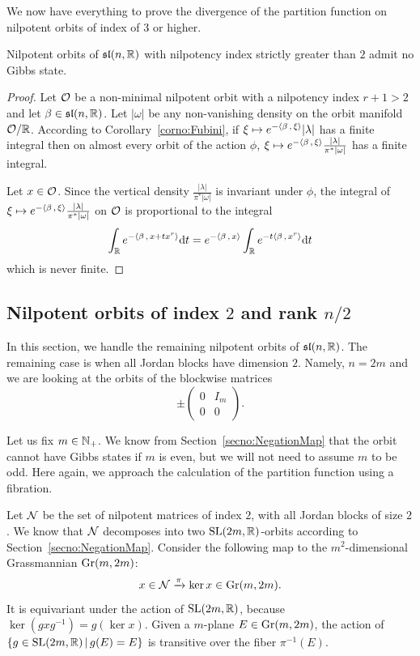 \documentclass[english]{article}
\begin{document}
We now have everything to prove the divergence of the partition function on nilpotent orbits of index of $3$ or higher.
\begin{theorem}
    Nilpotent orbits of $\mathfrak{sl}(n, \mathbb{R})$ with nilpotency index strictly greater than $2$ admit no Gibbs state.
\end{theorem}
\begin{proof}
    Let $\mathcal{O}$ be a non-minimal nilpotent orbit with a nilpotency index $r+1>2$ and let $\beta\in \mathfrak{sl}(n, \mathbb{R})$.
    Let $\left| \omega \right|$ be any non-vanishing density on the orbit manifold $\mathcal{O}/\mathbb{R}$. 
    According to Corollary~\ref{corno:Fubini}, if $\xi \mapsto e^{-\left\langle \beta \,,\, \xi \right\rangle} |\lambda|$ has a finite integral then on almost every orbit of the action $\phi$, $\xi \mapsto e^{-\left\langle \beta \,,\, \xi \right\rangle}  \frac{|\lambda|}{\pi^*|\omega|}$ has a finite integral.

    Let $x\in \mathcal{O}$. Since the vertical density $\frac{|\lambda|}{\pi^*|\omega|}$ is invariant under $\phi$, the integral of $\xi \mapsto e^{-\left\langle \beta \,,\, \xi \right\rangle} \frac{|\lambda|}{\pi^*|\omega|}$ on $\mathcal{O}$ is proportional to the integral
    \[
        \int_{\mathbb{R}} e^{-\left\langle \beta \,,\, x+tx^r \right\rangle} {\operatorname d} t = e^{-\left\langle \beta \,,\, x \right\rangle} \int_{\mathbb{R}} e^{-t\left\langle \beta \,,\, x^r \right\rangle} {\operatorname d} t 
    \]
    which is never finite.
\end{proof}


\subsection{Nilpotent orbits of index $2$ and rank $n/2$}
\label{secno:Grassmannian}

In this section, we handle the remaining nilpotent orbits of $\mathfrak{sl}(n, \mathbb{R})$. The remaining case is when all Jordan blocks have dimension $2$. Namely, $n=2m$ and we are looking at the orbits of the blockwise matrices
\[
	\pm
	\begin{pmatrix}
		0 & I_m\\
		0 & 0
	\end{pmatrix}
.\]

Let us fix $m\in \mathbb{N}_+$. We know from Section~\ref{secno:NegationMap} that the orbit cannot have Gibbs states if $m$ is even, but we will not need to assume $m$ to be odd.
Here again, we approach the calculation of the partition function using a fibration.

Let $\mathcal{N}$ be the set of nilpotent matrices of index $2$, with all Jordan blocks of size $2$. We know that $\mathcal{N}$ decomposes into two $\operatorname{SL}(2m, \mathbb{R})$-orbits according to Section~\ref{secno:NegationMap}. Consider the following map to the $m^2$-dimensional Grassmannian $\operatorname{Gr}(m, 2m)$:
\[
	x \in \mathcal{N} \xrightarrow{\pi} \ker x \in \operatorname{Gr}(m, 2m)
.\]
It is equivariant under the action of $\operatorname{SL}(2m, \mathbb{R})$, because $\ker (gxg^{-1}) = g (\ker x)$.
Given a $m$-plane $E\in \operatorname{Gr}(m,2m)$, the action of $\{g \in \operatorname{SL}(2m, \mathbb{R}) \, | \, g(E) = E\}$ is transitive over the fiber $\pi^{-1}(E)$.
\end{document}
